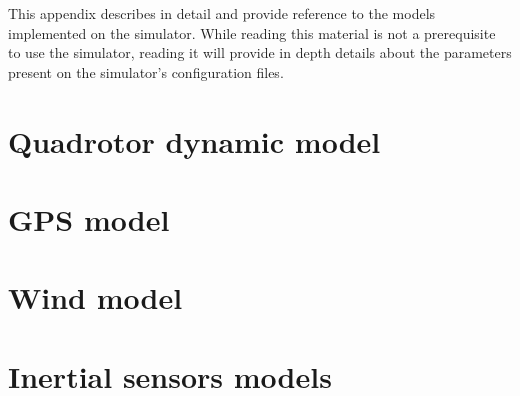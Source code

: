 \documentclass[a4paper,10pt]{report}
\begin{document}
This appendix describes in detail and provide reference to the models implemented on the simulator.
While reading this material is not a prerequisite to use the simulator, reading it will provide in depth details about the parameters present on the simulator's configuration files.

\section{Quadrotor dynamic model}


\section{GPS model}


\section{Wind model}


\section{Inertial sensors models}
\end{document}
